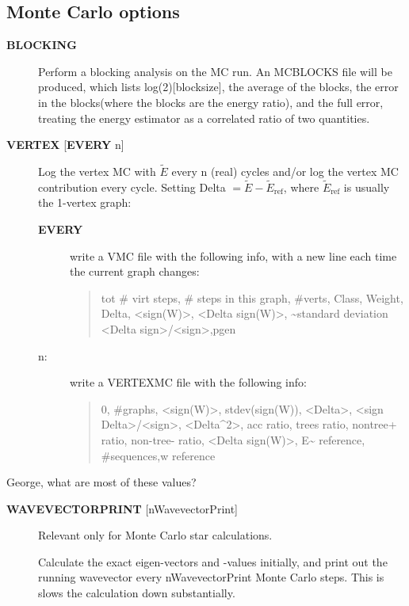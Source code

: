 \documentclass[openany,a4paper,10pt]{manual}
\begin{document}
\subsection{Monte Carlo options}
\begin{description}
\item[\textbf{BLOCKING}]
Perform a blocking analysis on the MC run.  An MCBLOCKS file will be
produced, which lists log(2){[}blocksize{]}, the average of the blocks,
the error in the blocks(where the blocks are the energy ratio),
and the full error, treating the energy estimator as a correlated
ratio of two quantities.

\item[\textbf{VERTEX} {[}\textbf{EVERY} n{]}]
Log the vertex MC with $\tilde{E}$ every n (real) cycles
and/or log the vertex MC contribution every cycle.  Setting
Delta $=\tilde{E}-\tilde{E}_{\textrm{ref}}$, where
$\tilde{E}_{\textrm{ref}}$ is usually the 1-vertex graph:
\begin{description}
\item[\textbf{EVERY}]
write a VMC file with the following info, with a new line each
time the current graph changes:
\begin{quote}

tot \# virt steps, \# steps in this graph, \#verts, Class, Weight, Delta, \textless{}sign(W)\textgreater{}, \textless{}Delta sign(W)\textgreater{}, \textasciitilde{}standard deviation \textless{}Delta sign\textgreater{}/\textless{}sign\textgreater{},pgen
\end{quote}

\item[n:]
write a VERTEXMC file with the following info:
\begin{quote}

0, \#graphs, \textless{}sign(W)\textgreater{}, stdev(sign(W)), \textless{}Delta\textgreater{}, \textless{}sign Delta\textgreater{}/\textless{}sign\textgreater{}, \textless{}Delta\textasciicircum{}2\textgreater{}, acc ratio, trees ratio, nontree+ ratio, non-tree- ratio, \textless{}Delta sign(W)\textgreater{}, E\textasciitilde{} reference, \#sequences,w reference
\end{quote}

\end{description}

\end{description}

\begin{notice}[note]
George, what are most of these values?
\end{notice}
\begin{description}
\item[\textbf{WAVEVECTORPRINT} {[}nWavevectorPrint{]}]
Relevant only for Monte Carlo star calculations.

Calculate the exact eigen-vectors and -values initially, and
print out the running wavevector every nWavevectorPrint Monte Carlo
steps. This is slows the calculation down substantially.

\end{description}
\end{document}
